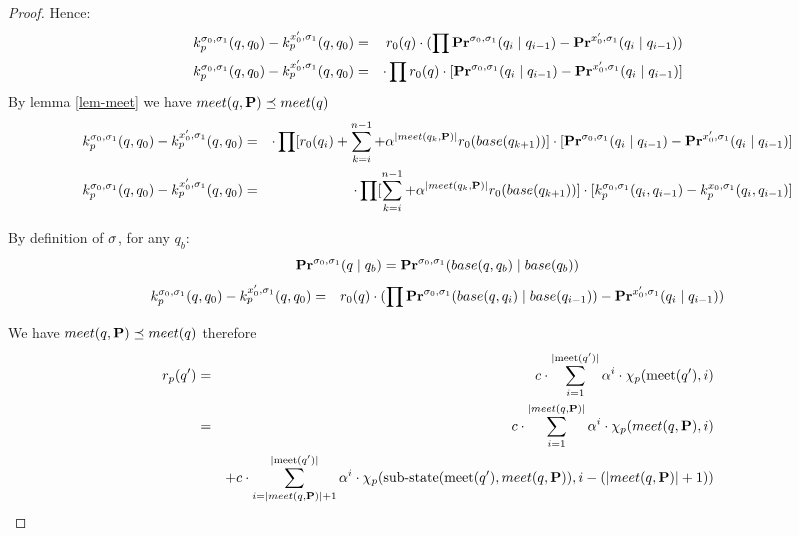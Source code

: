 \begin{proof}
	Hence:
	\begin{eqnarray*}
		k^{\sigma_0,\sigma_1}_p(q,q_0) -  k^{x_0',\sigma_1}_p(q,q_0)& =& r_0(q)  
		\cdot (\prod \mathbf{Pr}^{\sigma_0,\sigma_1}(q_{i} \mid q_{i-1}) - \mathbf{Pr}^{x_0',\sigma_1}(q_{i} \mid q_{i-1}))  \\
		k^{\sigma_0,\sigma_1}_p(q,q_0) -  k^{x_0',\sigma_1}_p(q,q_0)& =&  
		\cdot \prod r_0(q) \cdot [\mathbf{Pr}^{\sigma_0,\sigma_1}(q_{i} \mid q_{i-1}) - \mathbf{Pr}^{x_0',\sigma_1}(q_{i} \mid q_{i-1})]  \\
	\end{eqnarray*}
	By lemma \ref{lem-meet} we have $meet(q,\mathbf{P}) \preceq meet(q)$
	\begin{eqnarray*}
		k^{\sigma_0,\sigma_1}_p(q,q_0) -  k^{x_0',\sigma_1}_p(q,q_0)& =&  
		\cdot \prod [r_0(q_{i}) + \sum_{k=i}^{n-1}  + \alpha^{|meet(q_k,\mathbf{P})|} r_0(base(q_{k+1}))] \cdot [\mathbf{Pr}^{\sigma_0,\sigma_1}(q_{i} \mid q_{i-1}) - \mathbf{Pr}^{x_0',\sigma_1}(q_{i} \mid q_{i-1})]  \\
		k^{\sigma_0,\sigma_1}_p(q,q_0) -  k^{x_0',\sigma_1}_p(q,q_0)& =&  
		\cdot \prod [\sum_{k=i}^{n-1}  + \alpha^{|meet(q_k,\mathbf{P})|} r_0(base(q_{k+1}))] \cdot [k^{\sigma_0,\sigma_1}_p(q_{i}, q_{i-1}) - k^{x_0,\sigma_1}_p(q_{i}, q_{i-1})]  \\
	\end{eqnarray*}
	
	
	By definition of $\mathbf{\sigma}$, for any $q_b$: $$\mathbf{Pr}^{\sigma_0,\sigma_1}(q \mid q_b) =  \mathbf{Pr}^{\sigma_0,\sigma_1}(base(q,q_b) \mid base(q_b))$$
	\begin{eqnarray*}
		k^{\sigma_0,\sigma_1}_p(q,q_0) -  k^{x_0',\sigma_1}_p(q,q_0)& =& r_0(q)  
		\cdot (\prod \mathbf{Pr}^{\sigma_0,\sigma_1}(base(q,q_i) \mid base(q_{i-1})) - \mathbf{Pr}^{x_0',\sigma_1}(q_{i} \mid q_{i-1}))  \\
	\end{eqnarray*}		
	
	We have $meet(q,\mathbf{P}) \preceq meet(q)$ therefore
	\begin{eqnarray*}
		r_p(q') & = &{\displaystyle c \cdot \sum_{i=1}^{|\text{\rm meet}(q')|} \alpha^i \cdot \chi_p(\text{\rm meet}(q'),i)} \\
		& = & {\displaystyle c \cdot \sum_{i=1}^{|meet(q,\mathbf{P})|} \alpha^i \cdot \chi_p(meet(q,\mathbf{P}),i) } \\
		&&	+ {\displaystyle c \cdot \sum_{i=|meet(q,\mathbf{P})|+1}^{|\text{\rm meet}(q')|} \alpha^{i} \cdot \chi_p({\text{\rm sub-state}}(\text{\rm meet}(q'),meet(q,\mathbf{P})),i-(|meet(q,\mathbf{P})|+1))  }   \\
	\end{eqnarray*}
	

\end{proof}
